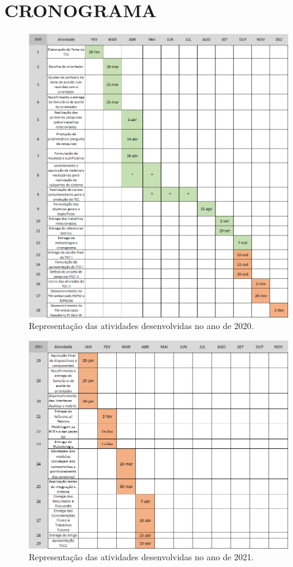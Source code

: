 
\chapter{CRONOGRAMA}
\label{chap:cronograma}

 \begin{figure}[H]
 	\centering
 	\includegraphics[width=1.0\textwidth]{tabelas/cronograma_2020.png}
 	\caption*{Representação das atividades desenvolvidas no ano de 2020.}
 \end{figure}
 \newpage
  \begin{figure}[H]
 	\centering
 	\includegraphics[width=1.0\textwidth]{tabelas/cronograma_2021.png}
 	\caption*{Representação das atividades desenvolvidas no ano de 2021.}
 \end{figure}